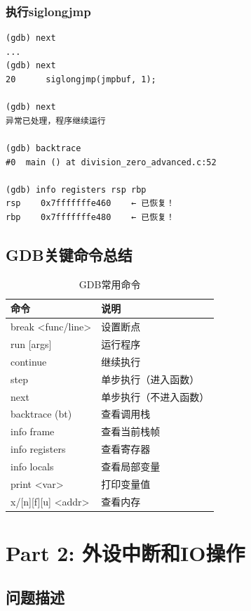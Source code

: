 \documentclass[UTF8,a4paper,12pt]{ctexart}
\begin{document}
\subsubsection{执行siglongjmp}

\begin{lstlisting}[style=bashstyle,caption={跳转恢复}]
(gdb) next
...
(gdb) next
20      siglongjmp(jmpbuf, 1);

(gdb) next
异常已处理，程序继续运行

(gdb) backtrace
#0  main () at division_zero_advanced.c:52

(gdb) info registers rsp rbp
rsp    0x7fffffffe460    ← 已恢复！
rbp    0x7fffffffe480    ← 已恢复！
\end{lstlisting}

\subsection{GDB关键命令总结}

\begin{table}[H]
\centering
\caption{GDB常用命令}
\begin{tabular}{lp{8cm}}
\toprule
\textbf{命令} & \textbf{说明} \\
\midrule
break <func/line> & 设置断点 \\
run [args] & 运行程序 \\
continue & 继续执行 \\
step & 单步执行（进入函数） \\
next & 单步执行（不进入函数） \\
backtrace (bt) & 查看调用栈 \\
info frame & 查看当前栈帧 \\
info registers & 查看寄存器 \\
info locals & 查看局部变量 \\
print <var> & 打印变量值 \\
x/[n][f][u] <addr> & 查看内存 \\
\bottomrule
\end{tabular}
\end{table}

\newpage

\section{Part 2: 外设中断和IO操作}

\subsection{问题描述}
\end{document}
